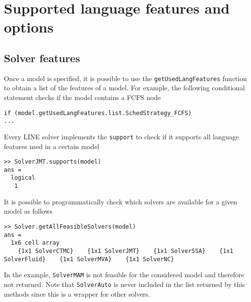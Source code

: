 
\section{Supported language features and options}
\subsection{Solver features}
Once a model is specified, it is possible to use the \texttt{getUsedLangFeatures} function to obtain a list of the features of a model. For example, the following conditional statement checks if the model contains a FCFS node
\begin{lstlisting}
if (model.getUsedLangFeatures.list.SchedStrategy_FCFS)
...
\end{lstlisting}
Every \textsc{LINE} solver implements the \texttt{support} to check if it supports all language features used in a certain model
\begin{lstlisting}
>> SolverJMT.supports(model)
ans =
  logical
   1
\end{lstlisting}
It is possible to programmatically check which solvers are available for a given model as follows
\begin{lstlisting}
>> Solver.getAllFeasibleSolvers(model)
ans =
  1x6 cell array
    {1x1 SolverCTMC}    {1x1 SolverJMT}    {1x1 SolverSSA}    {1x1 SolverFluid}    {1x1 SolverMVA}    {1x1 SolverNC}
\end{lstlisting}
In the example, \texttt{SolverMAM} is not feasible for the considered model and therefore not returned.  Note that \texttt{SolverAuto} is never included in the list returned by this methods since this is a wrapper for other solvers.

